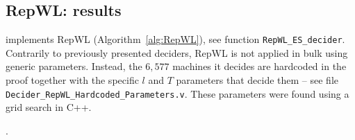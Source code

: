 \subsection{RepWL: results}

\CoqBB implements RepWL (Algorithm~\ref{alg:RepWL}), see function \texttt{RepWL\_ES\_decider}. Contrarily to previously presented deciders, RepWL is not applied in bulk using generic parameters. Instead, the ${6,577}$ machines it decides are hardcoded in the proof together with the specific $l$ and $T$ parameters that decide them -- see file \texttt{Decider\_RepWL\_Hardcoded\_Parameters.v}. These parameters were found using a grid search in C++.

.